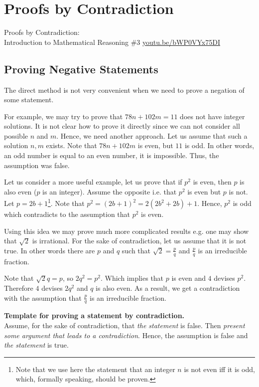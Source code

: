 \chapter{Proofs by Contradiction}
\begin{marginfigure}
  {\scriptsize Proofs by Contradiction:\\\noindent
  Introduction to Mathematical Reasoning \#3}
  \vskip 0.25cm
  \noindent
  \vskip 0.25cm
  \noindent
  \url{youtu.be/bWP0VYx75DI}
\end{marginfigure}
\section{Proving Negative Statements}
The direct method is not very convenient when we need to prove a negation of
some statement.

For example, we may try to prove that $78 n + 102 m = 11$ does not have integer
solutions. It is not clear how to prove it directly since we can not consider
all possible $n$ and $m$. Hence, we need another approach. Let us assume that
such a solution $n, m$ exists. Note that $78 n + 102 m$ is even, but $11$ is
odd. In other words, an odd number is equal to an even number, it is impossible.
Thus, the assumption was false.

Let us consider a more useful example, let us prove that if $p^2$ is even, then
$p$ is also even ($p$ is an integer). Assume the opposite i.e. that $p^2$ is
even but $p$ is not. Let $p = 2b + 1$\footnote{Note that we use here the
statement that an integer $n$ is not even iff it is odd, which, formally
speaking, should be proven.}. Note that $p^2 = (2b + 1)^2 = 2(2b^2 + 2b) + 1$.
Hence, $p^2$ is odd which contradicts to the assumption that $p^2$ is even.

Using this idea we may prove much more complicated results e.g. one may show
that $\sqrt{2}$ is irrational. For the sake of contradiction, let us assume
that it is not true. In other words there are $p$ and $q$ such that
$\sqrt{2} = \frac{p}{q}$ and $\frac{p}{q}$ is an irreducible fraction.

Note that $\sqrt{2} q = p$, so $2q^2 = p^2$. Which implies that $p$ is even
and $4$ devises $p^2$. Therefore $4$ devises $2q^2$ and $q$ is also even. As
a result, we get a contradiction with the assumption that $\frac{p}{q}$ is an
irreducible fraction.

\begin{template}
  \textbf{Template for proving a statement by contradiction.} \\

  Assume, for the sake of contradiction, that \textit{the statement} is false.
  Then \textit{present some argument that leads to a contradiction}. Hence, the
  assumption is false and \textit{the statement} is true.
\end{template}

